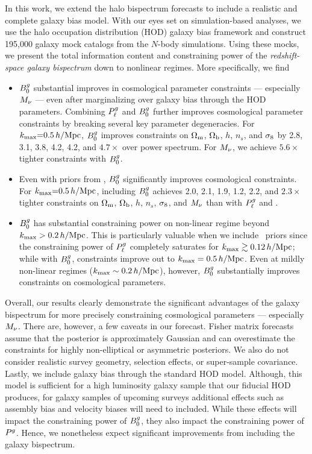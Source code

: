 In this work, we extend the \cite{hahn2020} halo bispectrum forecasts to
include a realistic and complete galaxy bias model. With our eyes set on
simulation-based analyses, we use the halo occupation distribution (HOD) galaxy
bias framework and construct 195,000 galaxy mock catalogs from the \quij 
$N$-body simulations. Using these mocks, we present the total information
content and constraining power of the {\em redshift-space galaxy bispectrum} 
down to nonlinear regimes. More specifically, we find
\begin{itemize}
    \item $B^g_0$ substantial improves in cosmological parameter constraints ---
    especially $M_\nu$ --- even after marginalizing over galaxy bias through
    the HOD parameters. Combining $P^g_{\ell}$ and $B^g_0$ further improves
    cosmological parameter constraints by breaking several key parameter
    degeneracies. For $k_{\rm max}{=}0.5\,h/\mathrm{Mpc}$, $B^g_0$ improves constraints on 
    $\Omega_{\rm m}$, $\Omega_{\rm b}$, $h$, $n_s$, and $\sigma_8$ by 2.8, 3.1, 3.8, 4.2, 4.2, and 
    $4.7{\times}$ over power spectrum. For $M_\nu$, we achieve $5.6\times$ 
    tighter constraints with $B^g_0$.
    \item Even with priors from \planck, $B^g_0$ significantly improves
    cosmological constraints. For $k_{\rm max}{=}0.5\,h/\mathrm{Mpc}$, including $B^g_0$ 
    achieves 2.0, 2.1, 1.9, 1.2, 2.2, and $2.3\times$ tighter constraints on 
    $\Omega_{\rm m}$, $\Omega_{\rm b}$, $h$, $n_s$, $\sigma_8$, and $M_\nu$ than with $P^g_{\ell}$ and \planck. 
    \item $B^g_0$ has substantial constraining power on non-linear regime beyond
    $k_{\rm max} > 0.2\,h/\mathrm{Mpc}$. This is particularly valuable when we include
    \planck~priors since the constraining power of $P^g_{\ell}$ completely saturates for $k_{\rm max} \gtrsim
    0.12\,h/\mathrm{Mpc}$; while with $B^g_0$, constraints improve out to $k_{\rm max}=0.5\,h/\mathrm{Mpc}$. 
    Even at mildly non-linear regimes ($k_{\rm max}\sim0.2\,h/\mathrm{Mpc}$), however, $B^g_0$
    substantially improves constraints on cosmological parameters. 
\end{itemize}

Overall, our results clearly demonstrate the significant advantages of the
galaxy bispectrum for more precisely constraining cosmological parameters ---
especially $M_\nu$. There are, however, a few caveats in our forecast. 
Fisher matrix forecasts assume that the posterior is approximately Gaussian and
can overestimate the constraints for highly non-elliptical or asymmetric
posteriors. We also do not consider realistic survey geometry, selection
effects, or super-sample covariance. Lastly, we include galaxy bias through the
standard \cite{zheng2007} HOD model. Although, this model is sufficient for 
a high luminosity galaxy sample that our fiducial HOD produces, for galaxy
samples of upcoming surveys additional effects such as assembly bias and
velocity biases will need to included. While these effects will impact the
constraining power of $B^g_0$, they also impact the constraining power of
$P^g$. Hence, we nonetheless expect significant improvements from including 
the galaxy bispectrum.

